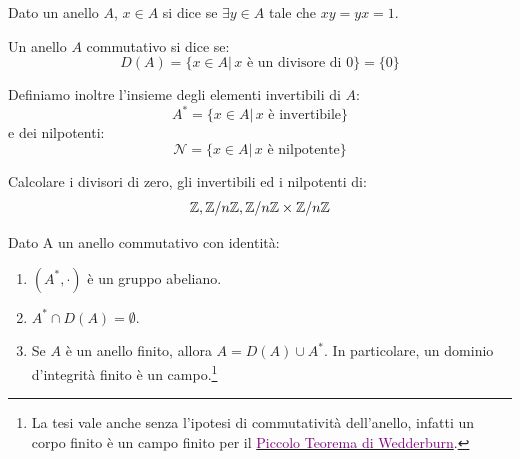 \documentclass[11pt]{scrartcl}
\begin{document}
\begin{definition}
    Dato un anello $A$, $x \in A$ si dice  se $\exists y \in A$ tale che $xy=yx=1$.
\end{definition}

\begin{definition}
    Un anello $A$ commutativo si dice  se:
        \[ D(A) = \{x \in A |\, \text{$x$ è un divisore di $0$}\} = \{0\}
            \]
\end{definition}

Definiamo inoltre l'insieme degli elementi invertibili di $A$:
    \[ A^* = \{x \in A |\, \text{$x$ è invertibile}\}
        \]
e dei nilpotenti:
    \[ \mathcal{N} = \{x \in A |\, \text{$x$ è nilpotente}\} 
        \]

\begin{exercise}
    Calcolare i divisori di zero, gli invertibili ed i nilpotenti di:
        \[ \mathbb Z, {\mathbb Z}/n{\mathbb Z}, {\mathbb Z}/n{\mathbb Z} \times {\mathbb Z}/n{\mathbb Z}
            \]
\end{exercise}

\begin{soln}
    
\end{soln}

\begin{proposition}
    Dato A un anello commutativo con identità:
    \begin{enumerate}[(1)]
        \item $(A^*,\cdot)$ è un gruppo abeliano.
        \item $A^* \cap D(A) = \emptyset$.
        \item Se $A$ è un anello finito, allora $A = D(A) \cup A^*$. In particolare, un dominio
            d'integrità finito è un campo.\footnote{La tesi vale anche senza l'ipotesi di commutatività
            dell'anello, infatti un corpo finito è un campo finito per il \href{https://en.wikipedia.org/wiki/Wedderburn\%27s_little_theorem}{\textcolor{purple}{Piccolo Teorema di Wedderburn}}.}
    \end{enumerate}
\end{proposition}
\end{document}
